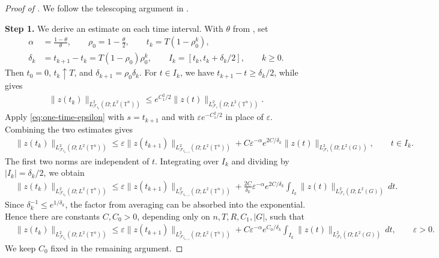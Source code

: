 \documentclass[print,wide]{draft}
\begin{document}
%

%
\begin{proof}[Proof of ]
We follow the telescoping argument in \cite[proof of Theorem~1]{Apraiz2014}.

\textbf{Step 1.} We derive an estimate on each time interval.
With $\theta$ from , set
\begin{align*}
\alpha&=\frac{1-\theta}{\theta},\qquad \rho_0=1-\frac\theta2,
\qquad t_k=T(1-\rho_0^k),\\
\delta_k&=t_{k+1}-t_k=T(1-\rho_0)\rho_0^k,
\qquad I_k=[t_k,t_k+\delta_k/2],\qquad k\geq0.
\end{align*}
Then $t_0=0$, $t_k\uparrow T$, and $\delta_{k+1}=\rho_0\delta_k$.
For $t\in I_k$, we have $t_{k+1}-t\geq\delta_k/2$, while
 gives
\begin{align*}
\lVert z(t_k)\rVert_{L^2_{\mathcal F_{t_k}}(\Omega;L^2(\mathbb T^n))}
\leq e^{C_1^2/2}
\lVert z(t)\rVert_{L^2_{\mathcal F_t}(\Omega;L^2(\mathbb T^n))}.
\end{align*}
Apply \eqref{eq:one-time-epsilon} with $s=t_{k+1}$ and with
$\varepsilon e^{-C_1^2/2}$ in place of $\varepsilon$.
Combining the two estimates gives
\begin{align*}
&\lVert z(t_k)\rVert_{L^2_{\mathcal F_{t_k}}(\Omega;L^2(\mathbb T^n))}
\leq\varepsilon
\lVert z(t_{k+1})\rVert_{L^2_{\mathcal F_{t_{k+1}}}(\Omega;L^2(\mathbb T^n))}
+C\varepsilon^{-\alpha}e^{2C/\delta_k}
\lVert z(t)\rVert_{L^2_{\mathcal F_t}(\Omega;L^2(G))},
\qquad t\in I_k.
\end{align*}
The first two norms are independent of $t$.  Integrating over $I_k$
and dividing by $|I_k|=\delta_k/2$, we obtain
\begin{align*}
&\lVert z(t_k)\rVert_{L^2_{\mathcal F_{t_k}}(\Omega;L^2(\mathbb T^n))}
\leq\varepsilon
\lVert z(t_{k+1})\rVert_{L^2_{\mathcal F_{t_{k+1}}}(\Omega;L^2(\mathbb T^n))}
+\frac{2C}{\delta_k}\varepsilon^{-\alpha}e^{2C/\delta_k}
\int_{I_k}\lVert z(t)\rVert_{L^2_{\mathcal F_t}(\Omega;L^2(G))}\,dt.
\end{align*}
Since $\delta_k^{-1}\leq e^{1/\delta_k}$, the factor from averaging
can be absorbed into the exponential.  Hence there are constants
$C,C_0>0$, depending only on $n,T,R,C_1,|G|$, such that
\begin{align}\label{eq:averaged-one-step}
&\lVert z(t_k)\rVert_{L^2_{\mathcal F_{t_k}}(\Omega;L^2(\mathbb T^n))}
\leq\varepsilon
\lVert z(t_{k+1})\rVert_{L^2_{\mathcal F_{t_{k+1}}}(\Omega;L^2(\mathbb T^n))}
+C\varepsilon^{-\alpha}e^{C_0/\delta_k}
\int_{I_k}\lVert z(t)\rVert_{L^2_{\mathcal F_t}(\Omega;L^2(G))}\,dt,
\qquad\varepsilon>0.
\end{align}
We keep $C_0$ fixed in the remaining argument.


\end{proof}
\end{document}

